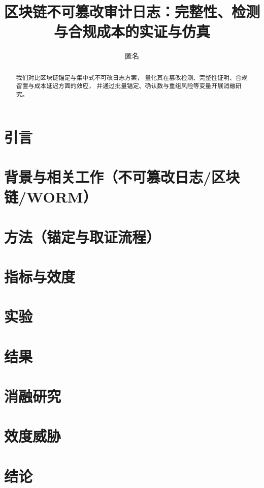 \documentclass[UTF8]{ctexart}
\title{区块链不可篡改审计日志：完整性、检测与合规成本的实证与仿真}
\author{匿名}
\date{}
\begin{document}
\maketitle

\begin{abstract}
我们对比区块链锚定与集中式不可改日志方案，
量化其在篡改检测、完整性证明、合规留置与成本延迟方面的效应，
并通过批量锚定、确认数与重组风险等变量开展消融研究。
\end{abstract}

\section{引言}
\section{背景与相关工作（不可篡改日志/区块链/WORM）}
\section{方法（锚定与取证流程）}
\section{指标与效度}
\section{实验}
\section{结果}
\section{消融研究}
\section{效度威胁}
\section{结论}



\end{document}
